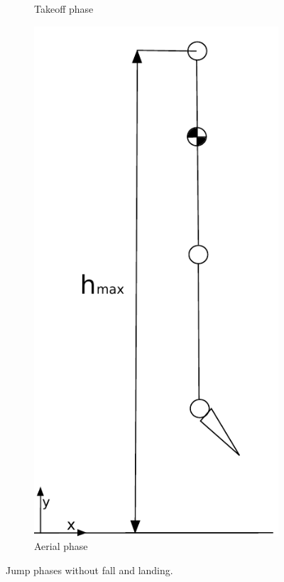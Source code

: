 \begin{figure}[ht!]
\begin{subfigure}[b]{0.3\textwidth}
        \caption{Takeoff phase}
        \label{fig:takeoff_phase}
    \end{subfigure}
    \begin{subfigure}[b]{0.3\textwidth}
        \includegraphics[width=\textwidth]{figures/flight_phase.pdf}
        \caption{Aerial phase}
        \label{fig:aerial_phase}
    \end{subfigure}
    \caption{Jump phases without fall and landing.}
    \label{fig:jump_phases}
\end{figure}
